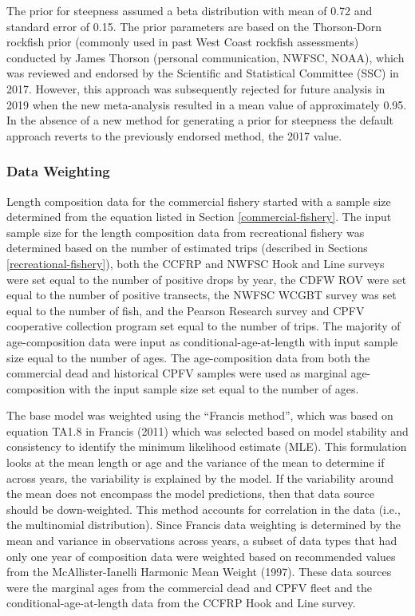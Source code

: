 \documentclass[11pt,
  english,
  letterpaper,
]{article}
\begin{document}
The prior for steepness assumed a beta distribution with mean of 0.72 and standard error of 0.15. The prior parameters are based on the Thorson-Dorn rockfish prior (commonly used in past West Coast rockfish assessments) conducted by James Thorson (personal communication, NWFSC, NOAA), which was reviewed and endorsed by the Scientific and Statistical Committee (SSC) in 2017. However, this approach was subsequently rejected for future analysis in 2019 when the new meta-analysis resulted in a mean value of approximately 0.95. In the absence of a new method for generating a prior for steepness the default approach reverts to the previously endorsed method, the 2017 value.

\hypertarget{data-weighting}{%
\subsubsection{Data Weighting}\label{data-weighting}}

Length composition data for the commercial fishery started with a sample size determined from the equation listed in Section \ref{commercial-fishery}. The input sample size for the length composition data from recreational fishery was determined based on the number of estimated trips (described in Sections \ref{recreational-fishery}), both the CCFRP and NWFSC Hook and Line surveys were set equal to the number of positive drops by year, the CDFW ROV were set equal to the number of positive transects, the NWFSC WCGBT survey was set equal to the number of fish, and the Pearson Research survey and CPFV cooperative collection program set equal to the number of trips. The majority of age-composition data were input as conditional-age-at-length with input sample size equal to the number of ages. The age-composition data from both the commercial dead and historical CPFV samples were used as marginal age-composition with the input sample size set equal to the number of ages.

The base model was weighted using the ``Francis method'', which was based on equation TA1.8 in Francis (2011) which was selected based on model stability and consistency to identify the minimum likelihood estimate (MLE). This formulation looks at the mean length or age and the variance of the mean to determine if across years, the variability is explained by the model. If the variability around the mean does not encompass the model predictions, then that data source should be down-weighted. This method accounts for correlation in the data (i.e., the multinomial distribution). Since Francis data weighting is determined by the mean and variance in observations across years, a subset of data types that had only one year of composition data were weighted based on recommended values from the McAllister-Ianelli Harmonic Mean Weight (1997). These data sources were the marginal ages from the commercial dead and CPFV fleet and the conditional-age-at-length data from the CCFRP Hook and Line survey.
\end{document}
